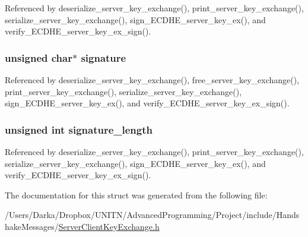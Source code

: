 Referenced by deserialize\+\_\+server\+\_\+key\+\_\+exchange(), print\+\_\+server\+\_\+key\+\_\+exchange(), serialize\+\_\+server\+\_\+key\+\_\+exchange(), sign\+\_\+\+E\+C\+D\+H\+E\+\_\+server\+\_\+key\+\_\+ex(), and verify\+\_\+\+E\+C\+D\+H\+E\+\_\+server\+\_\+key\+\_\+ex\+\_\+sign().

\subsubsection[{\texorpdfstring{signature}{signature}}]{\setlength{\rightskip}{0pt plus 5cm}unsigned char$\ast$ signature}\hypertarget{structecdhe__server__key__exchange__t_a775505f2a74638cda44fdd79c4e07993}{}\label{structecdhe__server__key__exchange__t_a775505f2a74638cda44fdd79c4e07993}


Referenced by deserialize\+\_\+server\+\_\+key\+\_\+exchange(), free\+\_\+server\+\_\+key\+\_\+exchange(), print\+\_\+server\+\_\+key\+\_\+exchange(), serialize\+\_\+server\+\_\+key\+\_\+exchange(), sign\+\_\+\+E\+C\+D\+H\+E\+\_\+server\+\_\+key\+\_\+ex(), and verify\+\_\+\+E\+C\+D\+H\+E\+\_\+server\+\_\+key\+\_\+ex\+\_\+sign().

\subsubsection[{\texorpdfstring{signature\+\_\+length}{signature_length}}]{\setlength{\rightskip}{0pt plus 5cm}unsigned int signature\+\_\+length}\hypertarget{structecdhe__server__key__exchange__t_a23a683d5129246d9adbd0029612d06a8}{}\label{structecdhe__server__key__exchange__t_a23a683d5129246d9adbd0029612d06a8}


Referenced by deserialize\+\_\+server\+\_\+key\+\_\+exchange(), print\+\_\+server\+\_\+key\+\_\+exchange(), serialize\+\_\+server\+\_\+key\+\_\+exchange(), sign\+\_\+\+E\+C\+D\+H\+E\+\_\+server\+\_\+key\+\_\+ex(), and verify\+\_\+\+E\+C\+D\+H\+E\+\_\+server\+\_\+key\+\_\+ex\+\_\+sign().



The documentation for this struct was generated from the following file\+:\begin{DoxyCompactItemize}
\item 
/\+Users/\+Darka/\+Dropbox/\+U\+N\+I\+T\+N/\+Advanced\+Programming/\+Project/include/\+Handshake\+Messages/\hyperlink{_server_client_key_exchange_8h}{Server\+Client\+Key\+Exchange.\+h}\end{DoxyCompactItemize}
